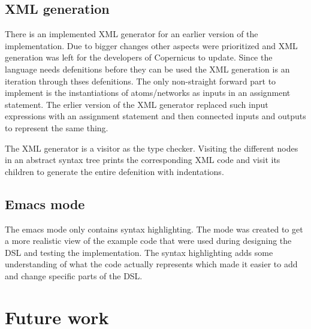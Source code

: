 \subsection{XML generation}\label{sec:xml}
There is an implemented XML generator for an earlier version of the
implementation. Due to bigger changes other aspects were prioritized
and XML generation was left for the developers of Copernicus to
update. Since the language needs defenitions before they can be used
the XML generation is an iteration through thses defenitions. The only
non-straight forward part to implement is the instantiations of
atoms/networks as inputs in an assignment statement. The erlier
version of the XML generator replaced such input expressions with an
assignment statement and then connected inputs and outputs to
represent the same thing.

The XML generator is a visitor as the type checker. Visiting the
different nodes in an abstract syntax tree prints the corresponding
XML code and visit its children to generate the entire defenition with
indentations.

\subsection{Emacs mode}\label{sec:emacs}
The emacs mode only contains syntax highlighting. The mode was created
to get a more realistic view of the example code that were used during
designing the DSL and testing the implementation. The syntax
highlighting adds some understanding of what the code actually
represents which made it easier to add and change specific parts of
the DSL.

\section{Future work}



